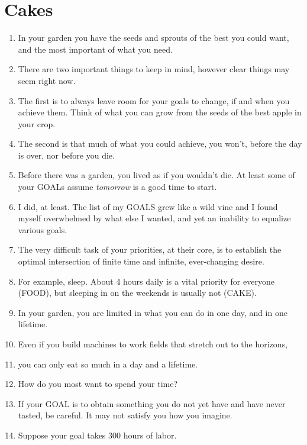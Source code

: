 \documentclass[
]{book}
\providecommand{\tightlist}{%
  \setlength{\itemsep}{0pt}\setlength{\parskip}{0pt}}
\begin{document}
\hypertarget{cakes}{%
\section{Cakes}\label{cakes}}

\begin{enumerate}
\def\labelenumi{\arabic{enumi}.}
\setcounter{enumi}{5}
\tightlist
\item
  In your garden you have the seeds and sprouts of the best you could want, and the most important of what you need.
\item
  There are two important things to keep in mind, however clear things may seem right now.\\
\item
  The first is to always leave room for your goals to change, if and when you achieve them. Think of what you can grow from the seeds of the best apple in your crop.
\item
  The second is that much of what you could achieve, you won't, before the day is over, nor before you die.
\item
  Before there was a garden, you lived as if you wouldn't die. At least some of your GOALs assume \emph{tomorrow} is a good time to start.\\
\item
  I did, at least. The list of my GOALS grew like a wild vine and I found myself
  overwhelmed by what else I wanted, and yet an inability to equalize various
  goals.
\item
  The very difficult task of your priorities, at their core, is to establish the optimal intersection of finite time and infinite, ever-changing desire.
\item
  For example, sleep. About 4 hours daily is a vital priority for everyone (FOOD), but sleeping in on the weekends is usually not (CAKE).
\item
  In your garden, you are limited in what you can do in one day, and in one lifetime.
\item
  Even if you build machines to work fields that stretch out to the horizons,
\item
  you can only eat so much in a day and a lifetime.
\item
  How do you most want to spend your time?
\item
  If your GOAL is to obtain something you do not yet have and have never
  tasted, be careful. It may not satisfy you how you imagine.
\item
  Suppose your goal takes 300 hours of labor.

\end{enumerate}
\end{document}
